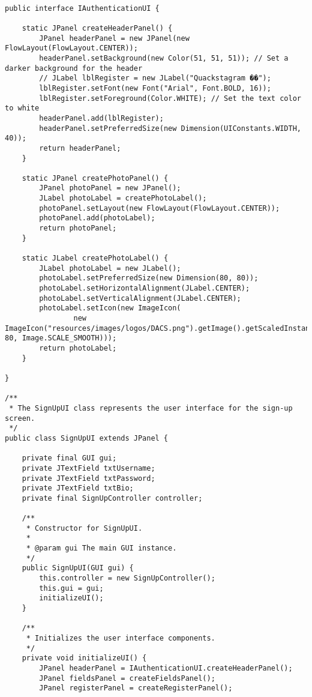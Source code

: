 \begin{lstlisting}[style=JavaStyle, caption={SignUpUI Class}, label={lst:SignUpUI-codesnippet}]

public interface IAuthenticationUI {

    static JPanel createHeaderPanel() {
        JPanel headerPanel = new JPanel(new FlowLayout(FlowLayout.CENTER));
        headerPanel.setBackground(new Color(51, 51, 51)); // Set a darker background for the header
        // JLabel lblRegister = new JLabel("Quackstagram ��");
        lblRegister.setFont(new Font("Arial", Font.BOLD, 16));
        lblRegister.setForeground(Color.WHITE); // Set the text color to white
        headerPanel.add(lblRegister);
        headerPanel.setPreferredSize(new Dimension(UIConstants.WIDTH, 40));
        return headerPanel;
    }

    static JPanel createPhotoPanel() {
        JPanel photoPanel = new JPanel();
        JLabel photoLabel = createPhotoLabel();
        photoPanel.setLayout(new FlowLayout(FlowLayout.CENTER));
        photoPanel.add(photoLabel);
        return photoPanel;
    }

    static JLabel createPhotoLabel() {
        JLabel photoLabel = new JLabel();
        photoLabel.setPreferredSize(new Dimension(80, 80));
        photoLabel.setHorizontalAlignment(JLabel.CENTER);
        photoLabel.setVerticalAlignment(JLabel.CENTER);
        photoLabel.setIcon(new ImageIcon(
                new ImageIcon("resources/images/logos/DACS.png").getImage().getScaledInstance(80, 80, Image.SCALE_SMOOTH)));
        return photoLabel;
    }
    
}

/**
 * The SignUpUI class represents the user interface for the sign-up screen.
 */
public class SignUpUI extends JPanel {

    private final GUI gui;
    private JTextField txtUsername;
    private JTextField txtPassword;
    private JTextField txtBio;
    private final SignUpController controller;

    /**
     * Constructor for SignUpUI.
     *
     * @param gui The main GUI instance.
     */
    public SignUpUI(GUI gui) {
        this.controller = new SignUpController();
        this.gui = gui;
        initializeUI();
    }

    /**
     * Initializes the user interface components.
     */
    private void initializeUI() {
        JPanel headerPanel = IAuthenticationUI.createHeaderPanel();
        JPanel fieldsPanel = createFieldsPanel();
        JPanel registerPanel = createRegisterPanel();


\end{lstlisting}
